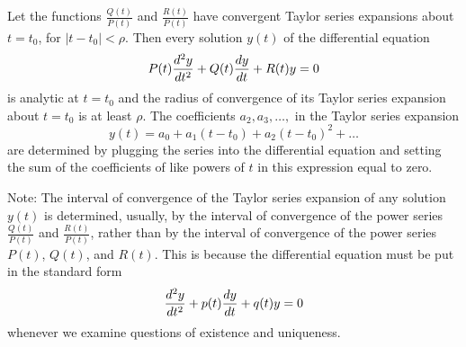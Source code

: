 \documentclass[12pt]{article}
\begin{document}
\begin{theorem} Let the functions $\frac{Q(t)}{P(t)}$ and $\frac{R(t)}{P(t)}$ have convergent Taylor series expansions about $t = t_0$, for $| t - t_0| < \rho$. Then every solution $y(t)$ of the differential equation $$P(t)\frac{d^2y}{dt^2} + Q(t)\frac{dy}{dt} + R(t)y = 0$$ is analytic at $t = t_0$ and the radius of convergence of its Taylor series expansion about $t = t_0$ is at least $\rho$. The coefficients $a_2, a_3, \dots, $ in the Taylor series expansion $$y(t) = a_0 + a_1(t - t_0) + a_2(t - t_0)^2 + \dots $$ are determined by plugging the series into the differential equation and setting the sum of the coefficients of like powers of $t$ in this expression equal to zero. \end{theorem} 
Note: The interval of convergence of the Taylor series expansion of any solution $y(t)$ is determined, usually, by the interval of convergence of the power series $\frac{Q(t)}{P(t)}$ and $\frac{R(t)}{P(t)}$, rather than by the interval of convergence of the power series $P(t)$, $Q(t)$, and $R(t)$. This is because the differential equation must be put in the standard form $$\frac{d^2y}{dt^2} + p(t)\frac{dy}{dt} + q(t)y = 0$$ whenever we examine questions of existence and uniqueness. 
\end{document}
